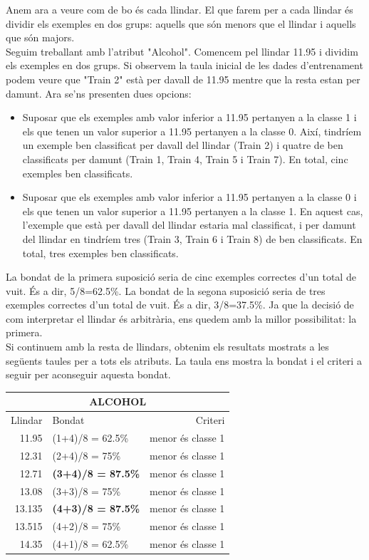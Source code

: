 \documentclass{article} %
\begin{document}
{	Anem ara a veure com de bo és cada llindar. El que farem per a cada llindar és dividir els exemples en dos grups: aquells que són menors que el llindar i aquells que són majors. \\

	Seguim treballant amb l'atribut "Alcohol". Comencem pel llindar 11.95 i dividim els exemples en dos grups. Si observem la taula inicial de les dades d'entrenament podem veure que "Train 2" està per davall de 11.95 mentre que la resta estan per damunt. Ara se'ns presenten dues opcions:

	\begin{itemize}
		\item Suposar que els exemples amb valor inferior a 11.95 pertanyen a la classe 1 i els que tenen un valor superior a 11.95 pertanyen a la classe 0. Així, tindríem un exemple ben classificat per davall del llindar (Train 2) i quatre de ben classificats per damunt (Train 1, Train 4, Train 5 i Train 7). En total, cinc exemples ben classificats.
		\item Suposar que els exemples amb valor inferior a 11.95 pertanyen a la classe 0 i els que tenen un valor superior a 11.95 pertanyen a la classe 1. En aquest cas, l’exemple que està per davall del llindar estaria mal classificat, i per damunt del llindar en tindríem tres (Train 3, Train 6 i Train 8) de ben classificats. En total, tres exemples ben classificats.
	\end{itemize}

	La bondat de la primera suposició seria de cinc exemples correctes d’un total de vuit. És a dir, 5/8=62.5\%. La bondat de la segona suposició seria de tres exemples correctes d’un total de vuit. És a dir, 3/8=37.5\%. Ja que la decisió de com interpretar el llindar és arbitrària, ens quedem amb la millor possibilitat: la primera. \\

	Si continuem amb la resta de llindars, obtenim els resultats mostrats a les següents taules per a tots els atributs. La taula ens mostra la bondat i el criteri a seguir per aconseguir aquesta bondat. \\

	{\selectfont\small
	\begin{tabular}{r | l | r}
	 	\multicolumn{3}{c}{ALCOHOL}  \\ \hline
	 	Llindar & Bondat & Criteri \\ \hline
		11.95  & (1+4)/8 = 62.5\% & menor és classe 1 \\
		12.31  & (2+4)/8 = 75\% & menor és classe 1 \\
		12.71  & \textbf{(3+4)/8 = 87.5\%} & menor és classe 1 \\
		13.08  & (3+3)/8 = 75\% & menor és classe 1 \\
		13.135 & \textbf{(4+3)/8 = 87.5\%} & menor és classe 1 \\
		13.515 & (4+2)/8 = 75\% & menor és classe 1 \\
		14.35  & (4+1)/8 = 62.5\% & menor és classe 1 \\
	\end{tabular}
	} \\

}
\end{document}
